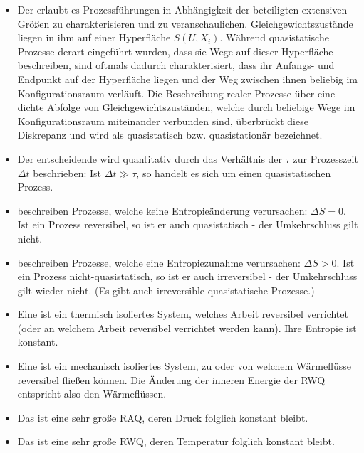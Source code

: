 \begin{summary}
    \begin{itemize}
        \item Der  erlaubt es Prozessführungen in Abhängigkeit der beteiligten extensiven Größen zu charakterisieren und zu veranschaulichen. Gleichgewichtszustände liegen in ihm auf einer Hyperfläche $S(U,X_i)$. Während quasistatische Prozesse derart eingeführt wurden, dass sie Wege auf dieser Hyperfläche beschreiben, sind  oftmals dadurch charakterisiert, dass ihr Anfangs- und Endpunkt auf der Hyperfläche liegen und der Weg zwischen ihnen beliebig im Konfigurationsraum verläuft. Die Beschreibung realer Prozesse über eine dichte Abfolge von Gleichgewichtszuständen, welche durch beliebige Wege im Konfigurationsraum miteinander verbunden sind, überbrückt diese Diskrepanz und wird als quasistatisch bzw. quasistationär bezeichnet.
        \item  Der entscheidende  wird quantitativ durch das Verhältnis der  $\tau$ zur Prozesszeit $\Delta t$ beschrieben: Ist $\Delta t\gg \tau$, so handelt es sich um einen quasistatischen Prozess. 
        \item {} beschreiben Prozesse, welche keine Entropieänderung verursachen: $\Delta S=0$. Ist ein Prozess reversibel, so ist er auch quasistatisch - der Umkehrschluss gilt nicht.
        \item {} beschreiben Prozesse, welche eine Entropiezunahme verursachen: $\Delta S>0$. Ist ein Prozess nicht-quasistatisch, so ist er auch irreversibel - der Umkehrschluss gilt wieder nicht. (Es gibt auch irreversible quasistatische Prozesse.)
        \item Eine  ist ein thermisch isoliertes System, welches Arbeit reversibel verrichtet (oder an welchem Arbeit reversibel verrichtet werden kann). Ihre Entropie ist konstant.
        \item Eine  ist ein mechanisch isoliertes System, zu oder von welchem Wärmeflüsse reversibel fließen können. Die Änderung der inneren Energie der RWQ entspricht also den Wärmeflüssen.
        \item Das  ist eine sehr große RAQ, deren Druck folglich konstant bleibt.
        \item Das  ist eine sehr große RWQ, deren Temperatur folglich konstant bleibt.
    \end{itemize}
    

\end{summary}
